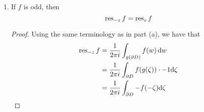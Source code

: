 \documentclass[../psets.tex]{subfiles}
\begin{document}
\begin{enumerate}[ref={A.\arabic*}]
\begin{enumerate}
\begin{proof}


            Let
            \begin{equation*}
                w = g(\zeta) := -\zeta
            \end{equation*}
            Additionally, let $D$ be a small disk around $z$ containing at most one singularity and containing one singularity iff that singularity is $z$. Then $g(D)$ is a small disk around $-z$ with the same singularity conditions. Therefore,
            \begingroup
            \allowdisplaybreaks
            \begin{align*}
                \res_{-z}f &= \frac{1}{2\pi i}\int_{g(\partial D)}f(w)\dd{w}\\
                &= \frac{1}{2\pi i}\int_{\partial D}f(g(\zeta))\cdot -1\dd\zeta\\
                &= -\frac{1}{2\pi i}\int_{\partial D}f(-\zeta)\dd\zeta\\
                &= -\frac{1}{2\pi i}\int_{\partial D}f(\zeta)\dd\zeta\\
                &= -\res_zf
            \end{align*}
            \endgroup
            as desired. Note that we can substitute $f(-\zeta)=f(\zeta)$ from the third to the fourth line, above, because $f$ is even by hypothesis.
        \end{proof}
        \item If $f$ is odd, then
        \begin{equation*}
            \operatorname{res}_{-z}f = \operatorname{res}_zf
        \end{equation*}
        \begin{proof}
            Using the same terminology as in part (a), we have that
            \begin{align*}
                \res_{-z}f &= \frac{1}{2\pi i}\int_{g(\partial D)}f(w)\dd{w}\\
                &= \frac{1}{2\pi i}\int_{\partial D}f(g(\zeta))\cdot -1\dd\zeta\\
                &= \frac{1}{2\pi i}\int_{\partial D}-f(-\zeta)\dd\zeta\\

\end{align*}
\end{proof}
\end{enumerate}
\end{enumerate}
\end{document}
